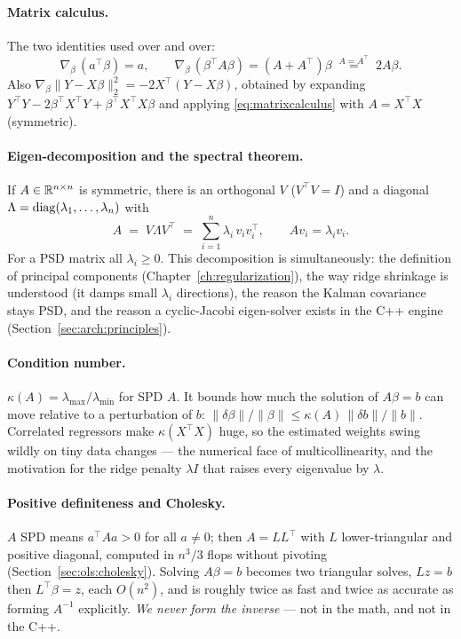 \paragraph{Matrix calculus.} The two identities used over and over:
\begin{equation}
  \nabla_{\beta}\,(a^{\top}\beta) = a,
  \qquad
  \nabla_{\beta}\,(\beta^{\top}A\beta) = (A+A^{\top})\beta
  \;\overset{A=A^{\top}}{=}\; 2A\beta .
  \label{eq:matrixcalculus}
\end{equation}
Also $\nabla_\beta\lVert Y-X\beta\rVert_2^2 = -2X^{\top}(Y-X\beta)$, obtained by
expanding $Y^{\top}Y-2\beta^{\top}X^{\top}Y+\beta^{\top}X^{\top}X\beta$ and applying
\eqref{eq:matrixcalculus} with $A=X^{\top}X$ (symmetric).

\paragraph{Eigen-decomposition and the spectral theorem.} If $A\in\mathbb{R}^{n\times n}$ is
symmetric, there is an orthogonal $V$ ($V^{\top}V=I$) and a diagonal
$\Lambda=\operatorname{diag}(\lambda_1,\dots,\lambda_n)$ with
\begin{equation}
  A \;=\; V\Lambda V^{\top} \;=\; \sum_{i=1}^n \lambda_i\, v_i v_i^{\top},
  \qquad A v_i = \lambda_i v_i .
  \label{eq:spectral}
\end{equation}
For a PSD matrix all $\lambda_i\ge0$. This decomposition is simultaneously: the
definition of principal components (Chapter~\ref{ch:regularization}), the way ridge
shrinkage is understood (it damps small $\lambda_i$ directions), the reason the Kalman
covariance stays PSD, and the reason a cyclic-Jacobi eigen-solver exists in the C++
engine (Section~\ref{sec:arch:principles}).

\paragraph{Condition number.} $\kappa(A)=\lambda_{\max}/\lambda_{\min}$ for SPD $A$.
It bounds how much the solution of $A\beta=b$ can move relative to a perturbation of
$b$: $\lVert\delta\beta\rVert/\lVert\beta\rVert \le \kappa(A)\,\lVert\delta b\rVert/\lVert b\rVert$.
Correlated regressors make $\kappa(X^{\top}X)$ huge, so the estimated weights swing
wildly on tiny data changes --- the numerical face of multicollinearity, and the
motivation for the ridge penalty $\lambda I$ that raises every eigenvalue by $\lambda$.

\paragraph{Positive definiteness and Cholesky.} $A$ SPD means $a^{\top}Aa>0$ for all
$a\ne0$; then $A=LL^{\top}$ with $L$ lower-triangular and positive diagonal, computed in
$n^3/3$ flops without pivoting (Section~\ref{sec:ols:cholesky}). Solving
$A\beta=b$ becomes two triangular solves, $Lz=b$ then $L^{\top}\beta=z$, each $O(n^2)$,
and is roughly twice as fast and twice as accurate as forming $A^{-1}$ explicitly.
\emph{We never form the inverse} --- not in the math, and not in the C++.
